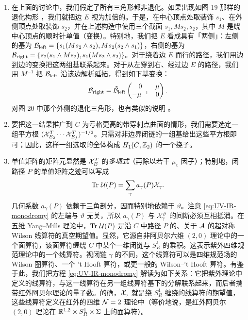 \begin{enumerate}

\item 在上面的讨论中，我们假定了所有三角形都非退化。如果出现如图 19 那样的退化构形%
，我们就把边 $E$ 视为加倍的。于是，在中心顶点处取装饰 $s_1$、在外侧顶点处取装饰 $s_2$，并在上述构造中使用三个截面 $s_1,Ms_2,s_2$，其中 $M$ 是绕中心顶点的顺时针单值（变换）。特别地，我们把 $E$ 看成具有「两侧」：左侧的基为 $\mathcal{B}_{\rm left} = \{ s_1 (M s_2 \wedge s_2), M s_2 ( s_2 \wedge s_1) \}$，右侧的基为 $\mathcal{B}_{\rm right} = \{ s_2 (s_1 \wedge M s_2),s_1 (M s_2 \wedge s_2) \}$。对于绕着边 $E$ 而行的路径，我们用边到边的变换把这两组基联系起来。对于从左穿到右、经过边 $E$ 的路径，我们用 $M^{-1}$ 把 $\mathcal{B}_{\rm left}$ 沿该边解析延拓，得到如下基变换：
\begin{equation}
\mathcal{B}_{\rm right} = \tilde {\mathcal{B}}_{\rm left} \begin{pmatrix} 0 & \mu \\ -
\mu^{-1} & 0 \end{pmatrix}.
\end{equation}
对图 20 中那个外侧的退化三角形，也有类似的说明%
。

\item 要把这一结果推广到 $C$ 为亏格更高的带穿刺点曲面的情形，我们需要选定一组平方根 $(\mathcal{X}_{E_2}^T \cdots \mathcal{X}_{E_f}^T)^{-1/2}$。只需对非边界闭链的一组基给出这些平方根即可；因此，这样一组选取的全体构成 $H_1(\bar C, \mathbb{Z}_2)$ 的一个挠子。

\item 单值矩阵的矩阵元显然是 $\mathcal{X}_{E}^T$ 的\emph{多项式}（再除以若干 $\mu_v$ 因子）；特别地，闭路径 $P$ 的单值矩阵之迹可以写成
\begin{equation}\label{eq:UV-IR-monodromy}
{\operatorname{Tr}}\ \mathcal{U}(P) = \sum_\gamma a_\gamma(P) \mathcal{X}_\gamma.
\end{equation}
几何系数 $a_\gamma(P)$ 依赖于三角剖分，因而特别地依赖于 $\vartheta$。注意 \eqref{eq:UV-IR-monodromy} 的左端与 $\vartheta$ 无关，所以 $a_{\gamma}(P)$ 与 $\mathcal{X}_\gamma^\vartheta$ 的间断必须互相抵消。在五维 Yang--Mills 理论中，${\operatorname{Tr}}\ \mathcal{U}(P)$ 是沿 $C$ 中路径 $P$ 的、关于 $\mathcal{A}$ 的超对称 Wilson 线算符的真空期望值。显然，它源自非阿贝尔六维 $(2,0)$ 理论中的一个面算符，该面算符缠绕 $C$ 中某个一维闭链与 $S^1_R$ 的乘积。这表示紫外四维规范理论中的一个线算符。视闭链 $\gamma$ 的不同，这个线算符可以是四维规范场的 Wilson 圈算符、一个 't Hooft 算符，或更一般的 Wilson--'t Hooft 算符。有鉴于此，我们把方程 \eqref{eq:UV-IR-monodromy} 解读为如下关系：它把紫外理论中定义的线算符，与这一线算符在另一组线算符基下的分解联系起来，而后者携带红外阿贝尔理论的量子数。的确，$\mathcal{X}_{\gamma}$ 就是绕 $S^1_R$ 缠绕的线算符的期望值，这些线算符定义在红外的四维 $\mathcal{N}=2$ 理论中（等价地说，是红外阿贝尔 $(2,0)$ 理论在 $\mathbb{R}^{1,2} \times S^1_R\times \Sigma$ 上的面算符）。


\end{enumerate}
